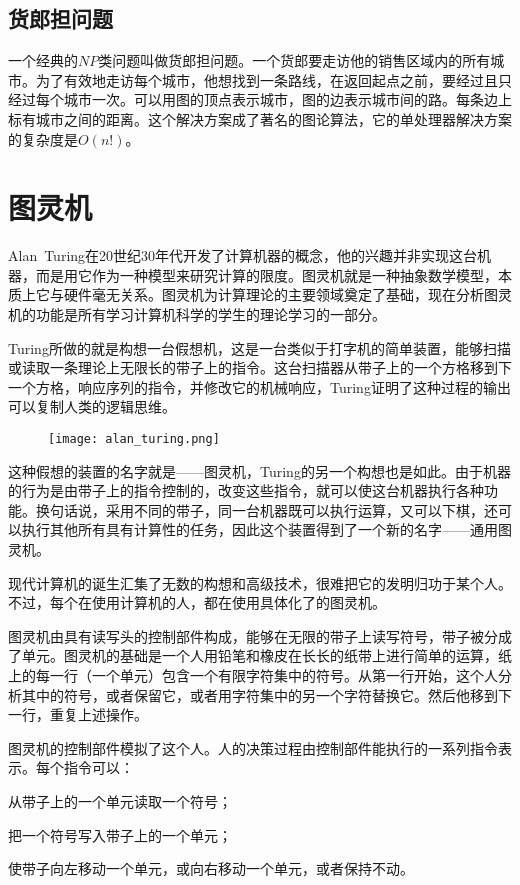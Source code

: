 \section{货郎担问题}

一个经典的$NP$类问题叫做货郎担问题。一个货郎要走访他的销售区域内的所有城市。为了有效地走访每个城市，他想找到一条路线，在返回起点之前，要经过且只经过每个城市一次。可以用图的顶点表示城市，图的边表示城市间的路。每条边上标有城市之间的距离。这个解决方案成了著名的图论算法，它的单处理器解决方案的复杂度是$O(n!)$。

\chapter{图灵机}

Alan~Turing在20世纪30年代开发了计算机器的概念，他的兴趣并非实现这台机器，而是用它作为一种模型来研究计算的限度。图灵机就是一种抽象数学模型，本质上它与硬件毫无关系。图灵机为计算理论的主要领域奠定了基础，现在分析图灵机的功能是所有学习计算机科学的学生的理论学习的一部分。

Turing所做的就是构想一台假想机，这是一台类似于打字机的简单装置，能够扫描或读取一条理论上无限长的带子上的指令。这台扫描器从带子上的一个方格移到下一个方格，响应序列的指令，并修改它的机械响应，Turing证明了这种过程的输出可以复制人类的逻辑思维。

\begin{figure}[htbp]
\centering
\texttt{[image: alan\_turing.png]}
\end{figure}

这种假想的装置的名字就是——图灵机，Turing的另一个构想也是如此。由于机器的行为是由带子上的指令控制的，改变这些指令，就可以使这台机器执行各种功能。换句话说，采用不同的带子，同一台机器既可以执行运算，又可以下棋，还可以执行其他所有具有计算性的任务，因此这个装置得到了一个新的名字——通用图灵机。

现代计算机的诞生汇集了无数的构想和高级技术，很难把它的发明归功于某个人。不过，每个在使用计算机的人，都在使用具体化了的图灵机。

图灵机由具有读写头的控制部件构成，能够在无限的带子上读写符号，带子被分成了单元。图灵机的基础是一个人用铅笔和橡皮在长长的纸带上进行简单的运算，纸上的每一行（一个单元）包含一个有限字符集中的符号。从第一行开始，这个人分析其中的符号，或者保留它，或者用字符集中的另一个字符替换它。然后他移到下一行，重复上述操作。

图灵机的控制部件模拟了这个人。人的决策过程由控制部件能执行的一系列指令表示。每个指令可以：
\begin{compactitem}
\item 从带子上的一个单元读取一个符号；
\item 把一个符号写入带子上的一个单元；
\item 使带子向左移动一个单元，或向右移动一个单元，或者保持不动。
\end{compactitem}

